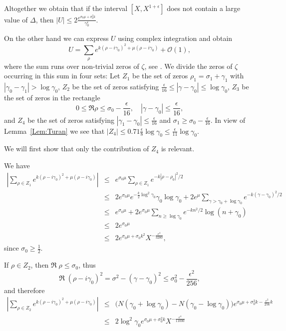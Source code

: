 \documentclass{amsart}
\begin{document}
Altogether we obtain that if the interval $[X, X^{1+\epsilon}]$ does not contain a large value of $\Delta$, then $|U|\leq 2\frac{e^{\sigma_0\mu+\sigma_0^2k}}{\gamma_0^\epsilon}$.

On the other hand we can express $U$ using complex integration and obtain
\[
U = \sum_\rho e^{k(\rho-i\gamma_0)^2+\mu(\rho-i\gamma_0)} + \mathcal{O}(1),
\]
where the sum runs over non-trivial zeros of $\zeta$, see \cite[(5.1)]{Pintz}. We divide the zeros of $\zeta$ occurring in this sum in four sets:  Let $Z_1$ be the set of zeros $\rho_1=\sigma_1+\gamma_1$ with $|\gamma_0-\gamma_1|>\log \gamma_0$, $Z_2$ be the set of zeros satisfying $\frac{\epsilon}{16}\leq |\gamma-\gamma_0|\leq\log \gamma_0$, $Z_3$ be the set of zeros in the rectangle
\[
0\leq\Re\rho\leq\sigma_0-\frac{\epsilon}{16},\quad |\gamma-\gamma_0|\leq\frac{\epsilon}{16},
\]
and $Z_4$ be the set of zeros satisfying $|\gamma_1-\gamma_0|\leq\frac{\epsilon}{16}$ and $\sigma_1\geq\sigma_0-\frac{\epsilon}{16}$. In view of Lemma~\ref{Lem:Turan} we see that $|Z_4|\leq 0.71\frac{\epsilon}{8}\log \gamma_0\leq \frac{\epsilon}{11}\log\gamma_0$.

We will first show that only the contribution of $Z_4$ is relevant.

We have
\begin{eqnarray*}
\left|\sum_{\rho\in Z_1} e^{k(\rho-i\gamma_0)^2+\mu(\rho-i\gamma_0)}\right| & \leq & 
e^{\sigma_0\mu} \sum_{\rho\in Z_1} e^{-k|\rho-\rho_0|^2/2}\\
 & \leq & 2e^{\sigma_0\mu} e^{-\frac{k}{2}\log^2\gamma_0}\gamma_0\log\gamma_0 +  2e^\mu\sum_{\gamma>\gamma_0+\log\gamma_0}e^{-k(\gamma-\gamma_0)^2/2}\\
  & \leq & e^{\sigma_0\mu} + 2e^{\sigma_0\mu} \sum_{n\geq \log\gamma_0} e^{-kn^2/2} \log(n+\gamma_0)\\
  & \leq & 2e^{\sigma_0\mu}\\
   & \leq & 2e^{\sigma_0\mu+\sigma_0k^2} X^{-\frac{\epsilon^4}{3200}},
\end{eqnarray*}
since  $\sigma_0\geq\frac{1}{2}$.

If $\rho\in Z_2$, then $\Re\;\rho\leq\sigma_0$, thus
\[
\Re\;(\rho-i\gamma_0)^2 = \sigma^2-(\gamma-\gamma_0)^2 \leq \sigma_0^2-\frac{\epsilon^2}{256},
\]
and therefore
\begin{eqnarray*}
\left|\sum_{\rho\in Z_2} e^{k(\rho-i\gamma_0)^2+\mu(\rho-i\gamma_0)}\right| & \leq &
\big(N(\gamma_0+\log \gamma_0)-N(\gamma_0-\log \gamma_0)\big)e^{\sigma_0\mu+\sigma_0^2k - \frac{\epsilon^2}{256}k}\\
 & \leq & 2\log^2\gamma_0 e^{\sigma_0\mu+\sigma_0^2k} X^{-\frac{\epsilon^4}{11000}}
\end{eqnarray*}
\end{document}
